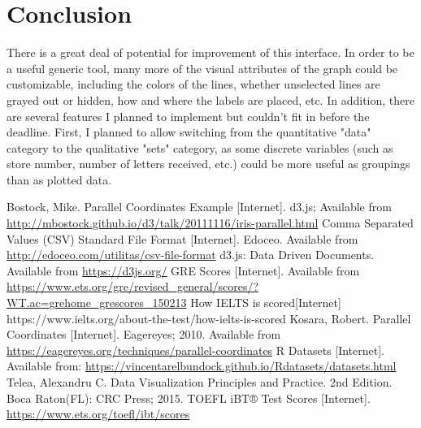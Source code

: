 \documentclass[]{article}
\begin{document}
\section{Conclusion}
	There is a great deal of potential for improvement of this interface. In order to be a useful generic tool, many more of the visual attributes of the graph could be customizable, including the colors of the lines, whether unselected lines are grayed out or hidden, how and where the labels are placed, etc. In addition, there are several features I planned to implement but couldn't fit in before the deadline. First, I planned to allow switching from the quantitative "data" category to the qualitative "sets" category, as some discrete variables (such as store number, number of letters received, etc.) could be more useful as groupings than as plotted data.

\vfill

\begin{thebibliography}{11}
		Bostock, Mike. Parallel Coordinates Example [Internet]. d3.js; Available from \url{http://mbostock.github.io/d3/talk/20111116/iris-parallel.html}
		Comma Separated Values (CSV) Standard File Format [Internet]. Edoceo. Available from \url{http://edoceo.com/utilitas/csv-file-format}
		d3.js: Data Driven Documents. Available from \url{https://d3js.org/}
		GRE Scores [Internet]. Available from \url{https://www.ets.org/gre/revised_general/scores/?WT.ac=grehome_grescores_150213}
		How IELTS is scored[Internet] https://www.ielts.org/about-the-test/how-ielts-is-scored
		Kosara, Robert. Parallel Coordinates [Internet]. Eagereyes; 2010. Available from \url{https://eagereyes.org/techniques/parallel-coordinates}
		R Datasets [Internet]. Available from: \url{https://vincentarelbundock.github.io/Rdatasets/datasets.html}
		Telea, Alexandru C. Data Visualization Principles and Practice. 2nd Edition. Boca Raton(FL): CRC Press; 2015.
		TOEFL iBT® Test Scores [Internet]. \url{https://www.ets.org/toefl/ibt/scores}
\end{thebibliography}
\end{document}
